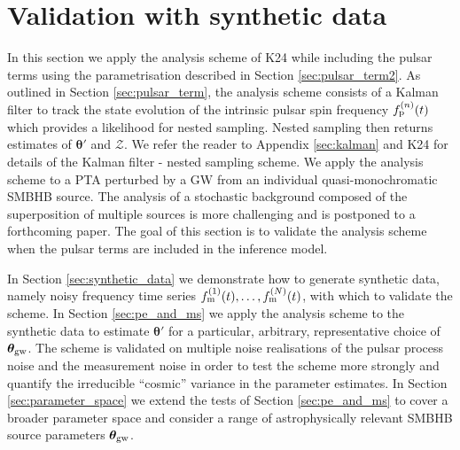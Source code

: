 \documentclass[fleqn,usenatbib,useAMS]{mnras}
\begin{document}
\section{Validation with synthetic data}\label{sec:rep_example1}
In this section we apply the analysis scheme of K24 while including the pulsar terms using the parametrisation described in Section \ref{sec:pulsar_term2}. As outlined in Section \ref{sec:pulsar_term}, the analysis scheme consists of a Kalman filter to track the state evolution of the intrinsic pulsar spin frequency $f_{\rm p}^{(n)}(t)$ which provides a likelihood for nested sampling. Nested sampling then returns estimates of $\boldsymbol{\theta'}$ and $\mathcal{Z}$. We refer the reader to Appendix \ref{sec:kalman} and K24 for details of the Kalman filter - nested sampling scheme. We apply the analysis scheme to a PTA perturbed by a GW from an individual quasi-monochromatic SMBHB source. The analysis of a stochastic background composed of the superposition of multiple sources is more challenging and is postponed to a forthcoming paper. The goal of this section is to validate the analysis scheme when the pulsar terms are included in the inference model. \newline 

In Section \ref{sec:synthetic_data} we demonstrate how to generate synthetic data, namely noisy frequency time series $f_{\rm m}^{(1)}(t), \dots, f_{\rm m}^{(N)}(t)$, with which to validate the scheme. In Section \ref{sec:pe_and_ms} we apply the analysis scheme to the synthetic data to estimate $\boldsymbol{\theta'}$ for a  particular, arbitrary, representative choice of $\boldsymbol{\theta}_{\rm gw}$. The scheme is validated on multiple noise realisations of the pulsar process noise and the measurement noise in order to test the scheme more strongly and quantify the  irreducible ``cosmic'' variance in the parameter estimates. In Section \ref{sec:parameter_space} we extend the tests of Section  \ref{sec:pe_and_ms}
to cover a broader parameter space and consider a range of astrophysically relevant SMBHB source parameters $\boldsymbol{\theta}_{\rm gw}$. 
\end{document}
